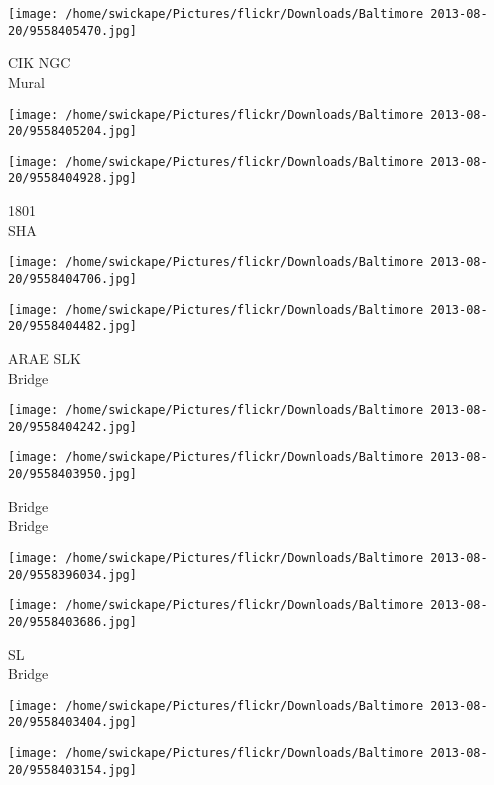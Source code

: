 \documentclass[10pt,letterpaper]{article}
\begin{document}
\vspace{0.25in}
\texttt{[image: /home/swickape/Pictures/flickr/Downloads/Baltimore 2013-08-20/9558405470.jpg]}

CIK NGC\\
Mural\\
\pagebreak

\texttt{[image: /home/swickape/Pictures/flickr/Downloads/Baltimore 2013-08-20/9558405204.jpg]}

\vspace{0.25in}
\texttt{[image: /home/swickape/Pictures/flickr/Downloads/Baltimore 2013-08-20/9558404928.jpg]}

1801\\
SHA\\
\pagebreak

\texttt{[image: /home/swickape/Pictures/flickr/Downloads/Baltimore 2013-08-20/9558404706.jpg]}

\vspace{0.25in}
\texttt{[image: /home/swickape/Pictures/flickr/Downloads/Baltimore 2013-08-20/9558404482.jpg]}

ARAE SLK\\
Bridge\\
\pagebreak

\texttt{[image: /home/swickape/Pictures/flickr/Downloads/Baltimore 2013-08-20/9558404242.jpg]}

\vspace{0.25in}
\texttt{[image: /home/swickape/Pictures/flickr/Downloads/Baltimore 2013-08-20/9558403950.jpg]}

Bridge\\
Bridge\\
\pagebreak

\texttt{[image: /home/swickape/Pictures/flickr/Downloads/Baltimore 2013-08-20/9558396034.jpg]}

\vspace{0.25in}
\texttt{[image: /home/swickape/Pictures/flickr/Downloads/Baltimore 2013-08-20/9558403686.jpg]}

SL\\
Bridge\\
\pagebreak

\texttt{[image: /home/swickape/Pictures/flickr/Downloads/Baltimore 2013-08-20/9558403404.jpg]}

\vspace{0.25in}
\texttt{[image: /home/swickape/Pictures/flickr/Downloads/Baltimore 2013-08-20/9558403154.jpg]}
\end{document}
